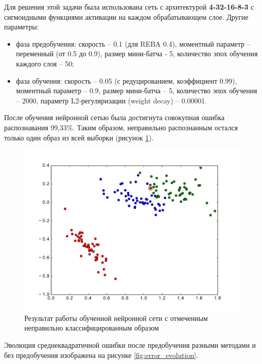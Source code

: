Для решения этой задачи была использована сеть с архитектурой \textbf{4-32-16-8-3} с сигмоидными функциями активации на каждом обрабатывающем слое. 
Другие параметры:
\begin{itemize}
	\item фаза предобучения: скорость -- 0.1 (для REBA 0.4), моментный параметр -- переменный (от 0.5 до 0.9), размер мини-батча - 5, количество эпох обучения каждого слоя -- 50;
	\item фаза обучения: скорость -- 0.05 (с редуцированием, коэффициент 0.99), моментный параметр -- 0.9, размер мини-батча -- 5, количество эпох обучения -- 2000, параметр L2-регуляризации (weight decay) -- 0.00001.
\end{itemize}

После обучения нейронной сетью была достигнута совокупная ошибка распознавания 99,33\%. Таким образом, неправильно распознанным остался только один образ из всей выборки (рисунок \ref{fig:fisher_irises_results}).

\begin{figure}[h]
	\begin{center}
		\includegraphics[width=12cm]{man-source/images/ch3/pic3-10.pdf}
		\caption{Результат работы обученной нейронной сети с отмеченным неправильно классифицированным образом}				
		\label{fig:fisher_irises_results}
	\end{center}
\end{figure}

Эволюция среднеквадратичной ошибки после предобучения разными методами и без предобучения изображена на рисунке \ref{fig:error_evolution}.


